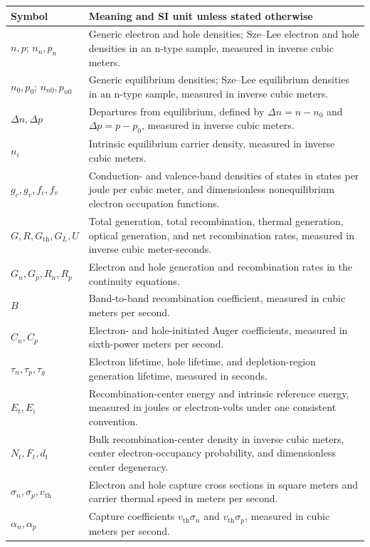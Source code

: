 \begin{center}
\small
\begin{tabularx}{\textwidth}{@{}lX@{}}
\toprule
Symbol & Meaning and SI unit unless stated otherwise \\
\midrule
$n,p$; $n_n,p_n$ & Generic electron and hole densities; Sze--Lee electron and hole densities in an n-type sample, measured in inverse cubic meters. \\
$n_0,p_0$; $n_{n0},p_{n0}$ & Generic equilibrium densities; Sze--Lee equilibrium densities in an n-type sample, measured in inverse cubic meters. \\
$\Delta n,\Delta p$ & Departures from equilibrium, defined by $\Delta n=n-n_0$ and $\Delta p=p-p_0$, measured in inverse cubic meters. \\
$n_i$ & Intrinsic equilibrium carrier density, measured in inverse cubic meters. \\
$g_c,g_v,f_c,f_v$ & Conduction- and valence-band densities of states in states per joule per cubic meter, and dimensionless nonequilibrium electron occupation functions. \\
$G,R,G_{\mathrm{th}},G_L,U$ & Total generation, total recombination, thermal generation, optical generation, and net recombination rates, measured in inverse cubic meter-seconds. \\
$G_n,G_p,R_n,R_p$ & Electron and hole generation and recombination rates in the continuity equations. \\
$B$ & Band-to-band recombination coefficient, measured in cubic meters per second. \\
$C_n,C_p$ & Electron- and hole-initiated Auger coefficients, measured in sixth-power meters per second. \\
$\tau_n,\tau_p,\tau_g$ & Electron lifetime, hole lifetime, and depletion-region generation lifetime, measured in seconds. \\
$E_t,E_i$ & Recombination-center energy and intrinsic reference energy, measured in joules or electron-volts under one consistent convention. \\
$N_t,F_t,d_t$ & Bulk recombination-center density in inverse cubic meters, center electron-occupancy probability, and dimensionless center degeneracy. \\
$\sigma_n,\sigma_p,v_{\mathrm{th}}$ & Electron and hole capture cross sections in square meters and carrier thermal speed in meters per second. \\
$\alpha_n,\alpha_p$ & Capture coefficients $v_{\mathrm{th}}\sigma_n$ and $v_{\mathrm{th}}\sigma_p$, measured in cubic meters per second. \\

\end{tabularx}
\end{center}
